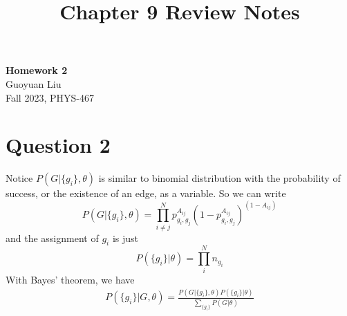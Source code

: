 \documentclass[11pt]{article}
\theoremstyle{definition}
\begin{document}
\title{Chapter 9 Review Notes}
\thispagestyle{empty}
\begin{center}
{\LARGE \bf Homework 2}\\
{\large Guoyuan Liu}\\
Fall 2023, PHYS-467
\end{center}

\section{Question 2}
Notice $P(G|\{g_i\}, \theta)$ is similar to binomial distribution with the probability of success, or the existence of an edge, as a variable. So we can write
\begin{equation}
    P(G|\{g_i\}, \theta) = \prod_{i\neq j}^N p_{g_i,g_j}^{A_{ij}} (1 - p_{g_i , g_j}^{A_{ij}})^ (1-A_{ij})
\end{equation}
and the assignment of $g_i$ is just
\begin{equation}
    P(\{g_i\}|\theta) = \prod_i^N n_{g_i}
\end{equation}
With Bayes' theorem, we have
\begin{align}
        P(\{g_i\}| G, \theta) = \frac{P(G|\{g_i\}, \theta) P(\{g_i\}|\theta)}{\sum_{\{g_i\}} P(G|\theta)}
\end{align}
\end{document}
